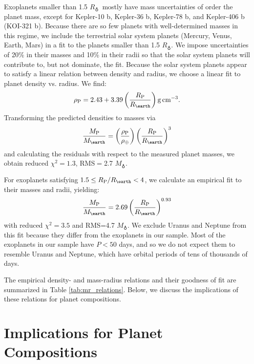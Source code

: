 \documentclass[iop]{emulateapj}
\newcommand{\gcmc}{\ensuremath{\rm g\,cm^{-3}}}
\newcommand{\gcc}{\gcmc}
\newcommand{\rpl}{\ensuremath{R_{\rm P}}}
\newcommand{\mpl}{\ensuremath{M_{\rm P}}}
\newcommand{\rhopl}{\ensuremath{\rho_{\rm P}}}
\newcommand{\rearth}{\ensuremath{R_\earth}}
\newcommand{\mearth}{\ensuremath{M_\earth}}
\begin{document}
Exoplanets smaller than 1.5 \rearth\ mostly have mass uncertainties of order the planet mass, except for Kepler-10 b, Kepler-36 b, Kepler-78 b, and Kepler-406 b (KOI-321 b).  Because there are so few planets with well-determined masses in this regime, we include the terrestrial solar system planets (Mercury, Venus, Earth, Mars) in a fit to the planets smaller than 1.5 \rearth.  We impose uncertainties of 20\% in their masses and 10\% in their radii so that the solar system planets will contribute to, but not dominate, the fit.  Because the solar system planets appear to satisfy a linear relation between density and radius, we choose a linear fit to planet density vs. radius.  We find:
\begin{equation}
\rhopl = 2.43 + 3.39 \left(\frac{\rpl}{\rearth}\right) \gcc.
\label{eqn:dr_lin_rocky}
\end{equation}
Transforming the predicted densities to masses via 
\begin{equation}
\frac{\mpl}{\mearth} = \left(\frac{\rhopl}{\rho_\oplus}\right) \left(\frac{\rpl}{\rearth}\right)^3
\end{equation}
and calculating the residuals with respect to the measured planet masses, we obtain reduced $\chi^2 = 1.3$, RMS$=$2.7 \mearth.

For exoplanets satisfying $1.5 \le \rpl/\rearth < 4$, we calculate an empirical fit to their masses and radii, yielding:
\begin{equation}
\frac{\mpl}{\mearth} = 2.69 \left(\frac{\rpl}{\rearth}\right)^{0.93}
\label{eqn:mr_plaw}
\end{equation}
with reduced $\chi^2=3.5$ and RMS=4.7 \mearth.  We exclude Uranus and Neptune from this fit because they differ from the exoplanets in our sample.  Most of the exoplanets in our sample have $P < 50$ days, and so we do not expect them to resemble Uranus and Neptune, which have orbital periods of tens of thousands of days.

The empirical density- and mass-radius relations and their goodness of fit are summarized in Table \ref{tab:mr_relations}.  Below, we discuss the implications of these relations for planet compositions.


\section{Implications for Planet Compositions}
	
\end{document}
